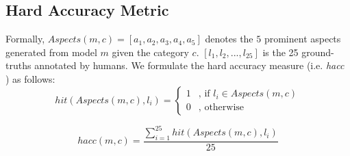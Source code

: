 \documentclass{article}
\begin{document}
	\subsection*{Hard Accuracy Metric}
	Formally, 
	$Aspects(m, c) = [a_1, a_2, a_3, a_4, a_5]$ denotes the $5$ 
	prominent aspects generated from model $m$ given the category $c$.
	$[l_1, l_2, ..., l_{25}]$ is the 25 ground-truths annotated by
	humans. 
	We formulate the hard accuracy measure (i.e. {\em hacc }) as follows:
		\begin{equation}
	hit(Aspects(m, c), l_i) = 
	\begin{cases}
	1 &  \text{, if $l_i\in Aspects(m, c)$} \\
	0 &  \text{, otherwise}
	\end{cases}
	\end{equation}
	
	\begin{equation}
	hacc(m, c) = \frac{\sum_{i=1}^{25}{hit(Aspects(m, c), l_i)}}{25}
	\end{equation}

	
\end{document}
